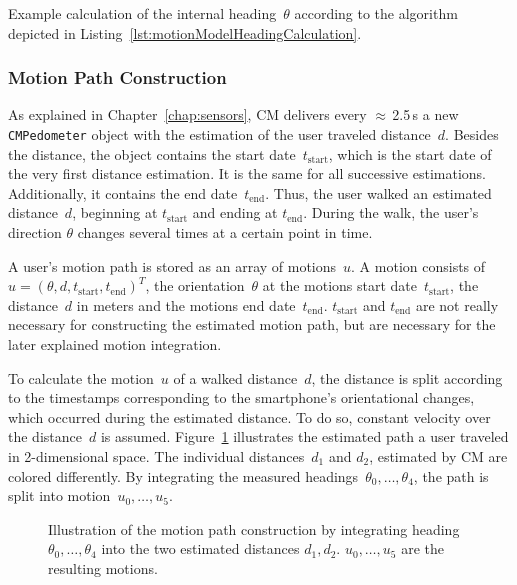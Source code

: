 

\begin{table}
	
	\caption{Example calculation of the internal heading~$\theta$ according to the algorithm depicted in Listing~\ref{lst:motionModelHeadingCalculation}.}
	\label{tab:motionModelHeadingCalculationExample}
\end{table}

\subsubsection*{Motion Path Construction}
As explained in Chapter~\ref{chap:sensors}, \acs{CM} delivers every $\approx$\,2.5\,s a new \texttt{CMPedometer} object with the estimation of the user traveled distance~$d$. Besides the distance, the object contains the start date~$t_\text{start}$, which is the start date of the very first distance estimation. It is the same for all successive estimations. Additionally, it contains the end date~$t_\text{end}$. Thus, the user walked an estimated distance~$d$, beginning at $t_\text{start}$ and ending at $t_\text{end}$. During the walk, the user's direction $\theta$ changes several times at a certain point in time.

A user's motion path is stored as an array of motions~$u$. A motion consists of $u = (\theta, d, t_\text{start}, t_\text{end})^T$, the orientation~$\theta$ at the motions start date~$t_\text{start}$, the distance~$d$ in meters and the motions end date~$t_\text{end}$. $t_\text{start}$ and $t_\text{end}$ are not really necessary for constructing the estimated motion path, but are necessary for the later explained motion integration.

To calculate the motion~$u$ of a walked distance~$d$, the distance is split according to the timestamps corresponding to the smartphone's orientational changes, which occurred during the estimated distance. To do so, constant velocity over the distance~$d$ is assumed. Figure~\ref{fig:mm_path} illustrates the estimated path a user traveled in 2-dimensional space. The individual distances~$d_1$ and $d_2$, estimated by \acs{CM} are colored differently. By integrating the measured headings~$\theta_0, \ldots, \theta_4$, the path is split into motion~$u_0, \ldots, u_5$.


\begin{figure}
	
	\caption{Illustration of the motion path construction by integrating heading $\theta_0, \ldots, \theta_4$ into the two estimated distances $d_1, d_2$. $u_0, \ldots, u_5$ are the resulting motions.}
	\label{fig:mm_path}
\end{figure}



